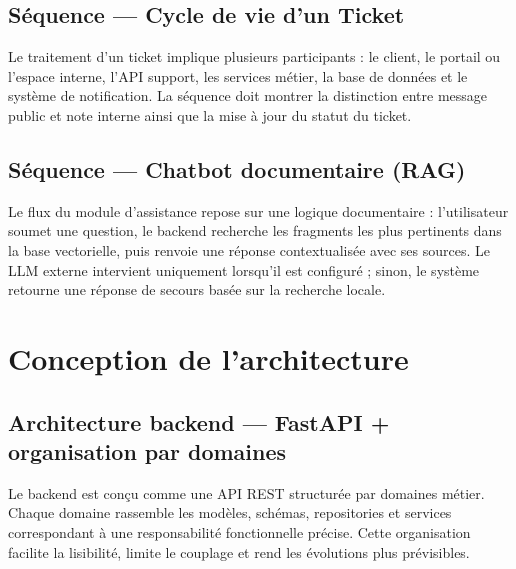 \subsection{Séquence --- Cycle de vie d'un Ticket}
Le traitement d'un ticket implique plusieurs participants : le client, le portail ou l'espace interne, l'API support, les services métier, la base de données et le système de notification. La séquence doit montrer la distinction entre message public et note interne ainsi que la mise à jour du statut du ticket.


\subsection{Séquence --- Chatbot documentaire (RAG)}
Le flux du module d'assistance repose sur une logique documentaire : l'utilisateur soumet une question, le backend recherche les fragments les plus pertinents dans la base vectorielle, puis renvoie une réponse contextualisée avec ses sources. Le LLM externe intervient uniquement lorsqu'il est configuré ; sinon, le système retourne une réponse de secours basée sur la recherche locale.


\section{Conception de l'architecture}

\subsection{Architecture backend --- FastAPI + organisation par domaines}
Le backend est conçu comme une API REST structurée par domaines métier. Chaque domaine rassemble les modèles, schémas, repositories et services correspondant à une responsabilité fonctionnelle précise. Cette organisation facilite la lisibilité, limite le couplage et rend les évolutions plus prévisibles.

